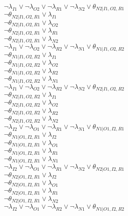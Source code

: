 $\neg\lambda_{I1} \vee \neg\lambda_{O2} \vee \neg\lambda_{R1} \vee \neg\lambda_{N2} \vee \theta_{N2|I1,O2,R1}$\\
$\neg\theta_{N2|I1,O2,R1} \vee \lambda_{I1}$\\
$\neg\theta_{N2|I1,O2,R1} \vee \lambda_{O2}$\\
$\neg\theta_{N2|I1,O2,R1} \vee \lambda_{R1}$\\
$\neg\theta_{N2|I1,O2,R1} \vee \lambda_{N2}$\\
$\neg\lambda_{I1} \vee \neg\lambda_{O2} \vee \neg\lambda_{R2} \vee \neg\lambda_{N1} \vee \theta_{N1|I1,O2,R2}$\\
$\neg\theta_{N1|I1,O2,R2} \vee \lambda_{I1}$\\
$\neg\theta_{N1|I1,O2,R2} \vee \lambda_{O2}$\\
$\neg\theta_{N1|I1,O2,R2} \vee \lambda_{R2}$\\
$\neg\theta_{N1|I1,O2,R2} \vee \lambda_{N1}$\\
$\neg\lambda_{I1} \vee \neg\lambda_{O2} \vee \neg\lambda_{R2} \vee \neg\lambda_{N2} \vee \theta_{N2|I1,O2,R2}$\\
$\neg\theta_{N2|I1,O2,R2} \vee \lambda_{I1}$\\
$\neg\theta_{N2|I1,O2,R2} \vee \lambda_{O2}$\\
$\neg\theta_{N2|I1,O2,R2} \vee \lambda_{R2}$\\
$\neg\theta_{N2|I1,O2,R2} \vee \lambda_{N2}$\\
$\neg\lambda_{I2} \vee \neg\lambda_{O1} \vee \neg\lambda_{R1} \vee \neg\lambda_{N1} \vee \theta_{N1|O1,I2,R1}$\\
$\neg\theta_{N1|O1,I2,R1} \vee \lambda_{I2}$\\
$\neg\theta_{N1|O1,I2,R1} \vee \lambda_{O1}$\\
$\neg\theta_{N1|O1,I2,R1} \vee \lambda_{R1}$\\
$\neg\theta_{N1|O1,I2,R1} \vee \lambda_{N1}$\\
$\neg\lambda_{I2} \vee \neg\lambda_{O1} \vee \neg\lambda_{R1} \vee \neg\lambda_{N2} \vee \theta_{N2|O1,I2,R1}$\\
$\neg\theta_{N2|O1,I2,R1} \vee \lambda_{I2}$\\
$\neg\theta_{N2|O1,I2,R1} \vee \lambda_{O1}$\\
$\neg\theta_{N2|O1,I2,R1} \vee \lambda_{R1}$\\
$\neg\theta_{N2|O1,I2,R1} \vee \lambda_{N2}$\\
$\neg\lambda_{I2} \vee \neg\lambda_{O1} \vee \neg\lambda_{R2} \vee \neg\lambda_{N1} \vee \theta_{N1|O1,I2,R2}$\\
